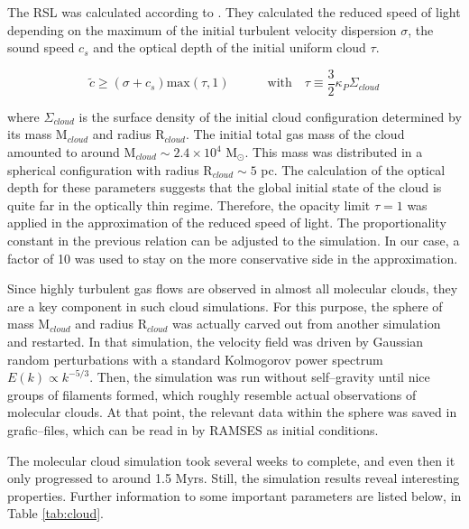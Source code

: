 The RSL was calculated according to \citet{Skinner_Ostriker}.
They calculated the reduced speed of light depending on the maximum of the initial turbulent velocity dispersion $\sigma$, the sound speed $c_{s}$ and the optical depth of the initial uniform cloud $\tau$.

\begin{equation}
  \tilde{c} \geq (\sigma + c_{s})\mathrm{max}(\tau, 1) \qquad\quad \text{with} \quad \tau\equiv\frac{3}{2}\kappa_{P}\Sigma_{cloud}
\label{eq:Skinner_Ostriker_RSLA}
\end{equation}

where $\Sigma_{cloud}$ is the surface density of the initial cloud configuration determined by its mass M$_{cloud}$ and radius R$_{cloud}$.
The initial total gas mass of the cloud amounted to around M$_{cloud} \sim 2.4\times10^{4}$ M$_{\odot}$.
This mass was distributed in a spherical configuration with radius R$_{cloud} \sim 5$ pc.
The calculation of the optical depth for these parameters suggests that the global initial state of the cloud is quite far in the optically thin regime.
Therefore, the opacity limit $\tau = 1$ was applied in the approximation of the reduced speed of light.
The proportionality constant in the previous relation can be adjusted to the simulation.
In our case, a factor of 10 was used to stay on the more conservative side in the approximation.

Since highly turbulent gas flows are observed in almost all molecular clouds, they are a key component in such cloud simulations.
For this purpose, the sphere of mass M$_{cloud}$ and radius R$_{cloud}$ was actually carved out from another simulation and restarted.
In that simulation, the velocity field was driven by Gaussian random perturbations with a standard Kolmogorov power spectrum $E(k) \propto k^{-5/3}$.
Then, the simulation was run without self--gravity until nice groups of filaments formed, which roughly resemble actual observations of molecular clouds.
At that point, the relevant data within the sphere was saved in grafic--files, which can be read in by RAMSES as initial conditions.

The molecular cloud simulation took several weeks to complete, and even then it only progressed to around 1.5 Myrs.
Still, the simulation results reveal interesting properties.
Further information to some important parameters are listed below, in Table \ref{tab:cloud}.

